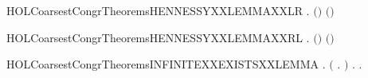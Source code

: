 \newcommand{\HOLCoarsestCongrTheoremsHENNESSYXXLEMMA}{\UseVerbatim{HOLCoarsestCongrTheoremsHENNESSYXXLEMMA}}
\begin{SaveVerbatim}{HOLCoarsestCongrTheoremsHENNESSYXXLEMMAXXLR}
\HOLTokenTurnstile{} \HOLSymConst{\HOLTokenForall{}} .
          \HOLSymConst{\HOLTokenImp{}}
          \HOLSymConst{\HOLTokenDisj{}}   \ensuremath{(}\HOLConst{\ensuremath{\tau}}\HOLSymConst{\ensuremath{\ldotp}}\ensuremath{)} \HOLSymConst{\HOLTokenDisj{}}  \ensuremath{(}\HOLConst{\ensuremath{\tau}}\HOLSymConst{\ensuremath{\ldotp}}\ensuremath{)} 
\end{SaveVerbatim}
\newcommand{\HOLCoarsestCongrTheoremsHENNESSYXXLEMMAXXLR}{\UseVerbatim{HOLCoarsestCongrTheoremsHENNESSYXXLEMMAXXLR}}
\begin{SaveVerbatim}{HOLCoarsestCongrTheoremsHENNESSYXXLEMMAXXRL}
\HOLTokenTurnstile{} \HOLSymConst{\HOLTokenForall{}} .
          \HOLSymConst{\HOLTokenDisj{}}   \ensuremath{(}\HOLConst{\ensuremath{\tau}}\HOLSymConst{\ensuremath{\ldotp}}\ensuremath{)} \HOLSymConst{\HOLTokenDisj{}}  \ensuremath{(}\HOLConst{\ensuremath{\tau}}\HOLSymConst{\ensuremath{\ldotp}}\ensuremath{)}  \HOLSymConst{\HOLTokenImp{}}
         
\end{SaveVerbatim}
\newcommand{\HOLCoarsestCongrTheoremsHENNESSYXXLEMMAXXRL}{\UseVerbatim{HOLCoarsestCongrTheoremsHENNESSYXXLEMMAXXRL}}
\begin{SaveVerbatim}{HOLCoarsestCongrTheoremsINFINITEXXEXISTSXXLEMMA}
\HOLTokenTurnstile{} \HOLSymConst{\HOLTokenForall{}}  .
         \HOLSymConst{\HOLTokenImp{}}
         \HOLSymConst{\HOLTokenConj{}}   \HOLSymConst{\HOLTokenConj{}}
       \ensuremath{(}\HOLSymConst{\HOLTokenForall{}} .  \HOLConst{\HOLTokenIn{}}  \HOLSymConst{\HOLTokenConj{}}  \HOLConst{\HOLTokenIn{}}  \HOLSymConst{\HOLTokenConj{}}  \HOLSymConst{\HOLTokenNotEqual{}}  \HOLSymConst{\HOLTokenImp{}} \HOLSymConst{\HOLTokenNeg{}}  \ensuremath{)} \HOLSymConst{\HOLTokenImp{}}
       \HOLSymConst{\HOLTokenExists{}}.  \HOLConst{\HOLTokenIn{}}  \HOLSymConst{\HOLTokenConj{}} \HOLSymConst{\HOLTokenForall{}}.  \HOLConst{\HOLTokenIn{}}  \HOLSymConst{\HOLTokenImp{}} \HOLSymConst{\HOLTokenNeg{}}  
\end{SaveVerbatim}
